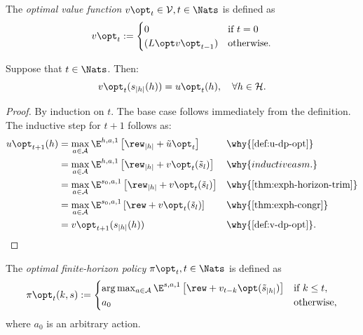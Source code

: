 \begin{definition} \label{def:v-dp-opt}
The \emph{optimal value function} $v\opt_t\in \mathcal{V}, t\in \Nats$ is defined as
\[
v\opt_t := 
\begin{cases}
    0 &\text{if } t = 0 \\
    (L\opt  v\opt _{t-1}) &\text{otherwise}.
\end{cases}
\]
\end{definition}

\begin{theorem}
Suppose that $t\in \Nats $. Then:
\[
v\opt_t(s_{|h|}(h)) = u\opt_t(h), \quad \forall h\in \mathcal{H}.
\]
\end{theorem}
\begin{proof}
By induction on $t$. The base case follows immediately from the definition. The inductive step for $t+1$ follows as:
\begin{align*}
  u\opt_{t+1}(h)
  &= \max_{a\in \mathcal{A}} \E^{h, a, 1} \left[ \rew_{|h|} + \tilde{u}\opt_t  \right]
  && \why{\cref{def:u-dp-opt}} \\
  &= \max_{a\in \mathcal{A}} \E^{h, a, 1} \left[ \rew_{|h|} + v\opt_t(\tilde{s}_l) \right] 
    && \why{inductive asm.}  \\
  &= \max_{a\in \mathcal{A}} \E^{s_0, a, 1} \left[ \rew_{|h|} + v\opt_t(\tilde{s}_l) \right]
    && \why{\cref{thm:exph-horizon-trim}} \\
  &= \max_{a\in \mathcal{A}} \E^{s_0, a, 1} \left[ \rew + v\opt_t(\tilde{s}_l) \right]
  && \why{\cref{thm:exph-congr}} \\
  &= v\opt_{t+1}(s_{|h|}(h)) && \why{\cref{def:v-dp-opt}}.
\end{align*}
\end{proof}


\begin{definition} \label{def:pi-opt}
  The \emph{optimal finite-horizon policy} $\pi\opt_t, t\in \Nats$ is defined as
  \[
    \pi\opt_t(k,s) :=
    \begin{cases}
      \arg\max_{a\in \mathcal{A}}  \E^{s, a, 1} \left[ \rew + v_{t-k}\opt (\tilde{s}_{|h|}) \right]
      &\text{if } k \le t, \\
      a_0 &\text{otherwise},
    \end{cases}
  \]
  where $a_0$ is an arbitrary action.
\end{definition}

